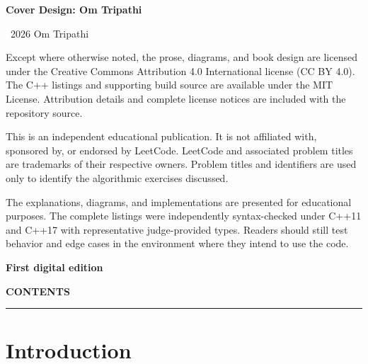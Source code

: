 \documentclass[12pt,oneside]{article}
\makeatletter
\newcommand{\booktitle}{Cracking the LeetCode Interview}
\newcommand{\printcontentsonly}{\@starttoc{toc}}
\makeatother
\begin{document}
\vfill
\begin{minipage}{0.88\linewidth}
\small
\textbf{Cover Design: Om Tripathi}\par
\textcopyright\ 2026 Om Tripathi\par
Except where otherwise noted, the prose, diagrams, and book design are
licensed under the Creative Commons Attribution 4.0 International license
(CC BY 4.0). The C++ listings and supporting build source are available under
the MIT License. Attribution details and complete license notices are included
with the repository source.

This is an independent educational publication. It is not affiliated with,
sponsored by, or endorsed by LeetCode. LeetCode and associated problem titles
are trademarks of their respective owners. Problem titles and identifiers are
used only to identify the algorithmic exercises discussed.

The explanations, diagrams, and implementations are presented for educational
purposes. The complete listings were independently syntax-checked under C++11
and C++17 with representative judge-provided types. Readers should still test
behavior and edge cases in the environment where they intend to use the code.

\textbf{First digital edition}\par
\end{minipage}
\vspace*{0.08\textheight}

\clearpage

\hypersetup{pageanchor=true}
\begingroup
\sloppy
{}
\setlength{\parskip}{0pt}
\fancyhead[RO]{\small\textcolor{navy}{Contents}}
\vspace*{0.15in}
\begin{center}
{\plexsans\fontsize{28}{32}\selectfont\bfseries\color{navy}CONTENTS}\par
\end{center}
\vspace{0.25em}
{\color{teal}\rule{\linewidth}{1pt}}\par
\vspace{0.85em}
\printcontentsonly
\endgroup
\clearpage
\fancyhead[RO]{\small\textcolor{navy}{\booktitle}}



\section*{Introduction}
\end{document}
